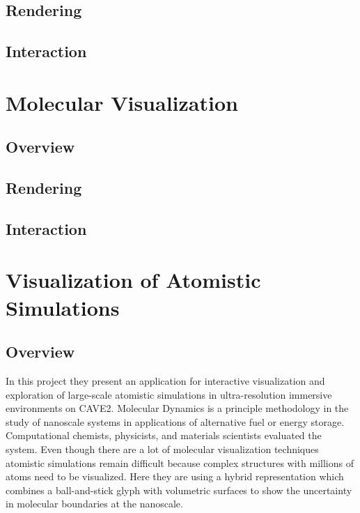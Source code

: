 \documentclass[10pt,twocolumn,letterpaper]{article}
\begin{document}
\subsection{Rendering}
\subsection{Interaction}

\section{Molecular Visualization}
\subsection{Overview}
\subsection{Rendering}
\subsection{Interaction}

\section{Visualization of Atomistic Simulations}
\subsection{Overview}
In this project \cite{reda_visualizing_2013} they present an application for interactive visualization and exploration of large-scale atomistic simulations in ultra-resolution immersive environments on CAVE2. Molecular Dynamics is a principle methodology in the study of nanoscale systems in applications of alternative fuel or energy storage. Computational chemists, physicists, and materials scientists evaluated the  system. Even though there are a lot of molecular visualization techniques atomistic simulations remain difficult because complex structures with millions of atoms need to be visualized. Here they are using a hybrid representation which combines a ball-and-stick glyph with volumetric surfaces to show the uncertainty in molecular boundaries at the nanoscale.
\end{document}
